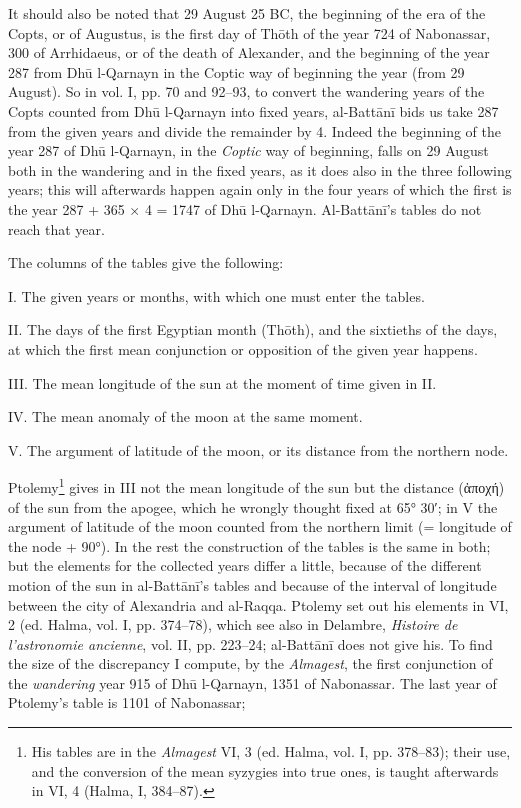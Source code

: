 \documentclass[11pt]{article}
\newcommand{\Pg}[1]{\marginpar{\footnotesize\color{gray}#1}}
\begin{document}
\par It should also be noted that 29 August 25 BC, the beginning of the era of the Copts, or of Augustus, is the first day of Thōth of the year 724 of Nabonassar, 300 of Arrhidaeus, or of the death of Alexander, and the beginning of the year 287 from Dhū l-Qarnayn in the Coptic way of beginning the year (from 29 August). So in vol. I, pp. 70 and 92–93, to convert the wandering years of the Copts counted from Dhū l-Qarnayn into fixed years, al-Battānī bids us take 287 from the given years and divide the remainder by 4. Indeed the beginning of the year 287 of Dhū l-Qarnayn, in the \emph{Coptic} way of beginning, falls on 29 August both in the wandering and in the fixed years, as it does also in the three following years; this will afterwards happen again only in the four years of which the first is the year 287 + 365 × 4 = 1747 of Dhū l-Qarnayn. Al-Battānī's tables do not reach that year.\par
\par The columns of the tables give the following:\par
\par I. The given years or months, with which one must enter the tables.\par
\par II. The days of the first Egyptian month (Thōth), and the sixtieths of the days, at which the first mean conjunction or opposition of the given year happens.\par
\par III. The mean longitude of the sun at the moment of time given in II.\par
\par IV. The mean anomaly of the moon at the same moment.\par
\par V. The argument of latitude of the moon, or its distance from the northern node.\par
\par \Pg{II 206}Ptolemy\footnote{His tables are in the \emph{Almagest} VI, 3 (ed. Halma, vol. I, pp. 378–83); their use, and the conversion of the mean syzygies into true ones, is taught afterwards in VI, 4 (Halma, I, 384–87).} gives in III not the mean longitude of the sun but the distance ({\greekfont ἀποχή}) of the sun from the apogee, which he wrongly thought fixed at 65° 30′; in V the argument of latitude of the moon counted from the northern limit (= longitude of the node + 90°). In the rest the construction of the tables is the same in both; but the elements for the collected years differ a little, because of the different motion of the sun in al-Battānī's tables and because of the interval of longitude between the city of Alexandria and al-Raqqa. Ptolemy set out his elements in VI, 2 (ed. Halma, vol. I, pp. 374–78), which see also in Delambre, \emph{Histoire de l'astronomie ancienne}, vol. II, pp. 223–24; al-Battānī does not give his. To find the size of the discrepancy I compute, by the \emph{Almagest}, the first conjunction of the \emph{wandering} year 915 of Dhū l-Qarnayn, 1351 of Nabonassar. The last year of Ptolemy's table is 1101 of Nabonassar;\par
\end{document}
